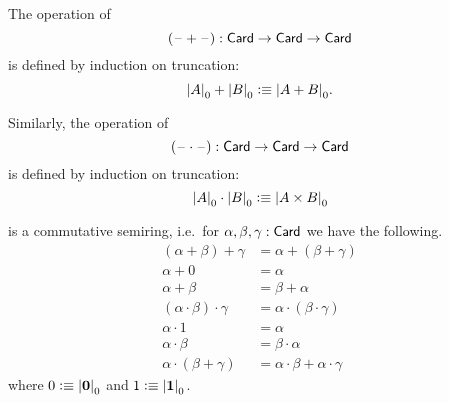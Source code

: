 \documentclass[hott-all.tex]{subfiles}
\begin{document}
% 
% 
\begin{defn}
  The operation of 
  \[ (\blank+\blank) : \card \to \card \to \card \]
  is defined by induction on truncation:
  \[ \cd{A} + \cd{B} \defeq \cd{A+B}.\]
\end{defn}
% 
\begin{defn}
  Similarly, the operation of 
  \[ (\blank\cdot\blank) : \card \to \card \to \card \]
  is defined by induction on truncation:
  \[ \cd{A} \cdot \cd{B} \defeq \cd{A\times B} \]
\end{defn}
% 
\begin{lem}
  \card is a commutative semiring, i.e.\ for $\alpha,\beta,\gamma:\card$ we have the following.
  \begin{align*}
    (\alpha+\beta)+\gamma &= \alpha+(\beta+\gamma)\\
    \alpha+0 &= \alpha\\
    \alpha + \beta &= \beta + \alpha\\
    (\alpha \cdot \beta) \cdot \gamma &= \alpha \cdot (\beta\cdot\gamma)\\
    \alpha \cdot 1 &= \alpha\\
    \alpha\cdot\beta &= \beta\cdot\alpha\\
    \alpha\cdot(\beta+\gamma) &= \alpha\cdot\beta + \alpha\cdot\gamma
  \end{align*}
  where $0 \defeq \cd{\emptyt}$ and $1\defeq\cd{\unit}$.
\end{lem}
\end{document}
